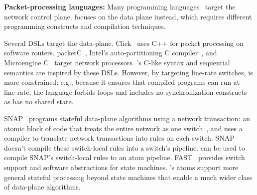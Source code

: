 \textbf{Packet-processing languages:}
Many programming languages~\cite{frenetic, maple} target the network control plane.
\pktlanguage focuses on the data plane instead, which requires different
programming constructs and compilation techniques.

Several DSLs target the data-plane. Click~\cite{click} uses C++ for packet
processing on software routers. packetC~\cite{packetc}, Intel's
auto-partitioning C compiler~\cite{intel_uiuc_pldi}, and Microengine
C~\cite{microenginec} target network processors. \pktlanguage's C-like syntax
and sequential semantics are inspired by these DSLs. However, by targeting
line-rate switches, \pktlanguage is more constrained: e.g., because it ensures
that compiled programs can run at line-rate, the language forbids loops and
includes no synchronization constructs as \absmachine has  no shared state.

SNAP~\cite{snap} programs stateful data-plane algorithms using a network
transaction: an atomic block of code that treats the entire network as one
switch~\cite{onebigswitch}, and uses a compiler to translate network
transactions into rules on each switch. SNAP doesn't compile these switch-local
rules into a switch's pipeline. \pktlanguage can be used to compile SNAP's
switch-local rules to an atom pipeline. FAST~\cite{fast} provides switch
support and software abstractions for state machines. \absmachine's atoms
support more general stateful processing beyond state machines that enable a
much wider class of data-plane algorithms.
